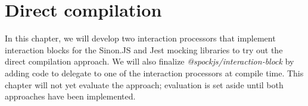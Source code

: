\chapter{Direct compilation}\label{chap:DirectCompilation}
In this chapter,
we will develop two interaction processors
that implement interaction blocks
for the Sinon.JS and Jest mocking libraries
to try out the direct compilation approach.
We will also finalize \textit{@spockjs/interaction-block} by adding code to
delegate to one of the interaction processors at compile time.
This chapter will not yet evaluate the approach;
evaluation is set aside until both approaches have been implemented.










